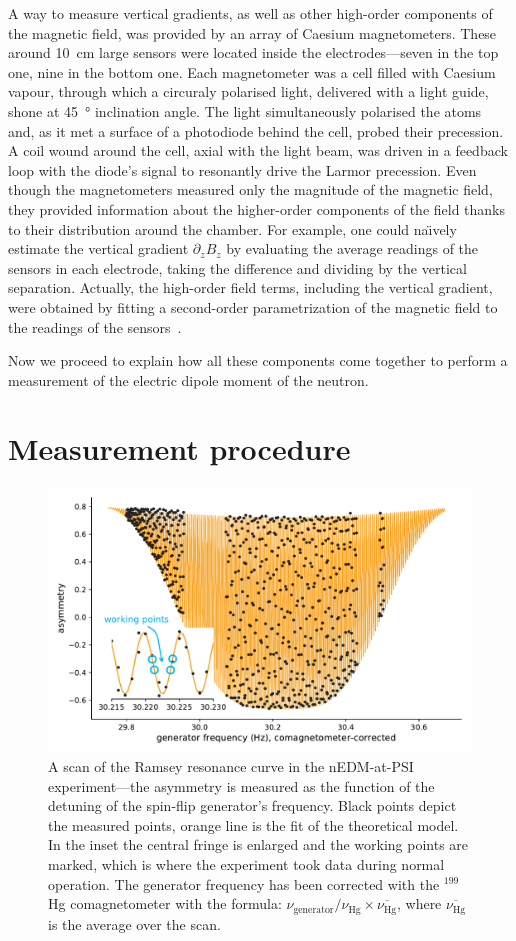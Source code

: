 A way to measure vertical gradients, as well as other high-order components of the magnetic field, was provided by an array of Caesium magnetometers. These around \SI{10}{\centi\meter} large sensors were located inside the electrodes---seven in the top one, nine in the bottom one. Each magnetometer was a cell filled with Caesium vapour, through which a circuraly polarised light, delivered with a light guide, shone at \SI{45}{\degree} inclination angle. The light simultaneously polarised the atoms and, as it met a surface of a photodiode behind the cell, probed their precession. A coil wound around the cell, axial with the light beam, was driven in a feedback loop with the diode's signal to resonantly drive the Larmor precession. Even though the magnetometers measured only the magnitude of the magnetic field, they provided information about the higher-order components of the field thanks to their distribution around the chamber. For example, one could na\"\i vely estimate the vertical gradient $\partial_z B_z$ by evaluating the average readings of the sensors in each electrode, taking the difference and dividing by the vertical separation. Actually, the high-order field terms, including the vertical gradient, were obtained by fitting a second-order parametrization of the magnetic field to the readings of the sensors~\cite{WurstenThesis}.

Now we proceed to explain how all these components come together to perform a measurement of the electric dipole moment of the neutron.



\section{Measurement procedure}
\begin{figure}
  \centering
  \includegraphics[width=0.8\linewidth]{gfx/nEDMatPSI/ramsey_scan.pdf}
  \caption{A scan of the Ramsey resonance curve in the nEDM-at-PSI experiment---the asymmetry is measured as the function of the detuning of the spin-flip generator's frequency. Black points depict the measured points, orange line is the fit of the theoretical model. In the inset the central fringe is enlarged and the working points are marked, which is where the experiment took data during normal operation. The generator frequency has been corrected with the $^{199}$Hg comagnetometer with the formula: $\nu_\text{generator} / \nu_\text{Hg} \times \overline{\nu_\text{Hg}}$, where $\overline{\nu_\text{Hg}}$ is the average over the scan.}
  \label{fig:ramsey_scan}
\end{figure}

